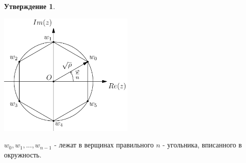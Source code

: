 \documentclass[a4paper, 12pt]{article}
\theoremstyle{definition}
\newtheorem*{subtheorem}{Утверждение}
\begin{document}
\begin{subtheorem}


    \begin{center}
      \includegraphics[width=6.5cm]{image/lecture-20.pdf}
    \end{center}
    $w_0, w_1,...,w_{n-1}$  - лежат в верщинах правильного $n$ - угольника, вписанного в окружность.  
  \end{subtheorem} 
\end{document}
